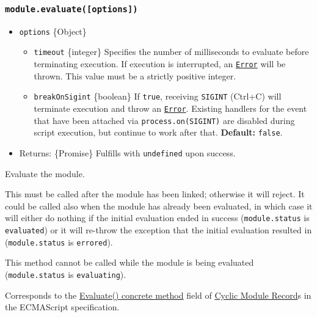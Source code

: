 \subsubsection{\texorpdfstring{\texttt{module.evaluate({[}options{]})}}{module.evaluate({[}options{]})}}\label{module.evaluateoptions}

\begin{itemize}
\tightlist
\item
  \texttt{options} \{Object\}

  \begin{itemize}
  \tightlist
  \item
    \texttt{timeout} \{integer\} Specifies the number of milliseconds to
    evaluate before terminating execution. If execution is interrupted,
    an \href{errors.md\#class-error}{\texttt{Error}} will be thrown.
    This value must be a strictly positive integer.
  \item
    \texttt{breakOnSigint} \{boolean\} If \texttt{true}, receiving
    \texttt{SIGINT} (Ctrl+C) will terminate execution and throw an
    \href{errors.md\#class-error}{\texttt{Error}}. Existing handlers for
    the event that have been attached via
    \texttt{process.on(\textquotesingle{}SIGINT\textquotesingle{})} are
    disabled during script execution, but continue to work after that.
    \textbf{Default:} \texttt{false}.
  \end{itemize}
\item
  Returns: \{Promise\} Fulfills with \texttt{undefined} upon success.
\end{itemize}

Evaluate the module.

This must be called after the module has been linked; otherwise it will
reject. It could be called also when the module has already been
evaluated, in which case it will either do nothing if the initial
evaluation ended in success (\texttt{module.status} is
\texttt{\textquotesingle{}evaluated\textquotesingle{}}) or it will
re-throw the exception that the initial evaluation resulted in
(\texttt{module.status} is
\texttt{\textquotesingle{}errored\textquotesingle{}}).

This method cannot be called while the module is being evaluated
(\texttt{module.status} is
\texttt{\textquotesingle{}evaluating\textquotesingle{}}).

Corresponds to the
\href{https://tc39.es/ecma262/\#sec-moduleevaluation}{Evaluate()
concrete method} field of
\href{https://tc39.es/ecma262/\#sec-cyclic-module-records}{Cyclic Module
Record}s in the ECMAScript specification.

